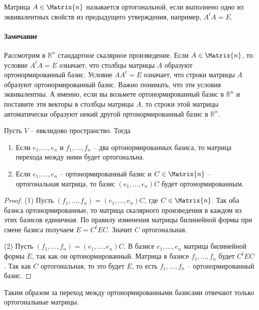 \begin{definition}
Матрица $A\in \Matrix{n}$ называется ортогональной, если выполнено одно из эквивалентных свойств из предыдущего утверждения, например, $A^t A = E$.
\end{definition}

\paragraph{Замечание}

Рассмотрим в $\mathbb R^n$ стандартное скалярное произведение.
Если $A\in\Matrix{n}$, то условие $A^t A = E$ означает, что столбцы матрицы $A$ образуют ортонормированный базис.
Условие $A A^t = E$ означает, что строки матрицы $A$ образуют ортонормированный базис.
Важно понимать, что эти условия эквивалентны.
А именно, если вы возьмете ортонормированный базис в $\mathbb R^n$ и поставите эти векторы в столбцы матрицы $A$, то строки этой матрицы автоматически образуют некий другой ортонормированный базис в $\mathbb R^n$.

\begin{claim}
\label{claim::OrthoBasisDiscrEucl}
Пусть $V$ -- евклидово пространство.
Тогда
\begin{enumerate}
\item Если $e_1,\ldots,e_n$ и $f_1,\ldots,f_n$ -- два ортонормированных базиса, то матрица перехода между ними будет ортогональна.

\item Если $e_1,\ldots,e_n$ -- ортонормированный базис и $C\in \Matrix{n}$ -- ортогональная матрица, то базис $(e_1,\ldots,e_n)C$ будет ортонормированным.
\end{enumerate}
\end{claim}
\begin{proof}
(1) Пусть $(f_1,\ldots,f_n) = (e_1,\ldots,e_n)C$, где $C\in \Matrix{n}$.
Так оба базиса ортонормированные, то матрица скалярного произведения в каждом из этих базисов единичная.
По правилу изменения матрицы билинейной формы при смене базиса получаем $E = C^t E C$.
Значит $C$ ортогональная.

(2) Пусть $(f_1,\ldots,f_n) = (e_1,\ldots,e_n)C$.
В базисе $e_1,\ldots,e_n$ матрица билинейной формы $E$, так как он ортонормированный.
Матрица в базисе $f_1,\ldots,f_n$ будет $C^t E C$.
Так как $C$ ортогональная, то это будет $E$, то есть $f_1,\ldots,f_n$ -- ортонормированный базис.
\end{proof}

Таким образом за переход между ортонормированными базисами отвечают только ортогональные матрицы.


